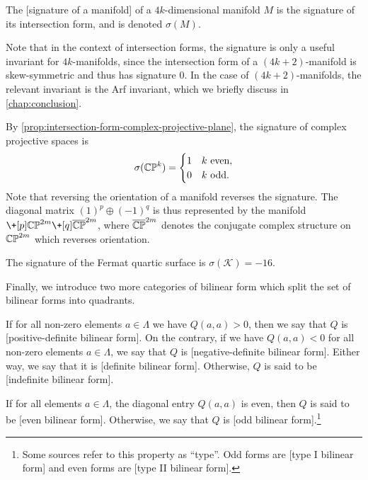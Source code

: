\begin{definition}
	The [signature of a manifold] of a $4k$-dimensional manifold $M$ is the signature of its intersection form, and is denoted $\sigma(M)$.
\end{definition}

\begin{remark}
	Note that in the context of intersection forms, the signature is only a useful invariant for $4k$-manifolds, since the intersection form of a $(4k+2)$-manifold is skew-symmetric and thus has signature $0$. In the case of $(4k+2)$-manifolds, the relevant invariant is the Arf invariant, which we briefly discuss in \cref{chap:conclusion}.
\end{remark}

\begin{example}
	By \cref{prop:intersection-form-complex-projective-plane}, the signature of complex projective spaces is
	\[
		\sigma(\mathbb{CP}^k)=\begin{cases}1 & k\textrm{ even},\\ 0 & k\textrm{ odd}.\end{cases}
	\]
	Note that reversing the orientation of a manifold reverses the signature. The diagonal matrix $(1)^p\oplus (-1)^q$ is thus represented by the manifold $\+[p] \CP^{2m} \+[q] \overline{\CP}^{2m}$, where $\overline{\mathbb{CP}}^{2m}$ denotes the conjugate complex structure on $\mathbb{CP}^{2m}$ which reverses orientation.
\end{example}

\begin{example}
	The signature of the Fermat quartic surface is $\sigma(\mathcal{K})=-16$.
\end{example}

Finally, we introduce two more categories of bilinear form which split the set of bilinear forms into quadrants.

\begin{definition}
	If for all non-zero elements $a\in \Lambda$ we have $Q(a,a)>0$, then we say that $Q$ is [positive-definite bilinear form]. On the contrary, if we have $Q(a,a)<0$ for all non-zero elements $a\in \Lambda$, we say that $Q$ is [negative-definite bilinear form]. Either way, we say that it is [definite bilinear form]. Otherwise, $Q$ is said to be [indefinite bilinear form].
\end{definition}

\begin{definition}
	If for all elements $a\in \Lambda$, the diagonal entry $Q(a,a)$ is even, then $Q$ is said to be [even bilinear form]. Otherwise, we say that $Q$ is [odd bilinear form].\footnote{Some sources refer to this property as ``type''. Odd forms are [type I bilinear form] and even forms are [type II bilinear form].}
\end{definition}

